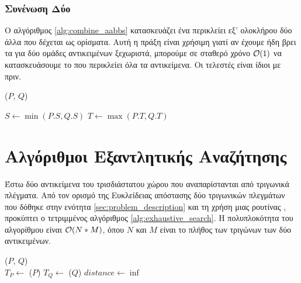 \subsubsection{Συνένωση Δύο }
Ο αλγόριθμος \ref{alg:combine_aabbs} κατασκευάζει ένα  περικλείει
εξ' ολοκλήρου δύο άλλα  που δέχεται ως ορίσματα. 
Αυτή η πράξη είναι χρήσιμη γιατί αν έχουμε ήδη βρει τα  για δύο 
ομάδες αντικειμένων ξεχωριστά, μπορούμε σε σταθερό χρόνο $\mathcal{O}(1)$ να 
κατασκευάσουμε το  που περικλείει όλα τα αντικείμενα. 
Οι τελεστές  είναι ίδιοι με πριν.

\IncMargin{1.5em}
\begin{algorithm}[H]
    \label{alg:combine_aabbs}
    \caption[Κατασκευή  από δύο άλλα ]{
    }
    \DontPrintSemicolon
    \Indm\nonl\combineAABB($P$, $Q$)\\
    \Indp
        
    $S \gets \min(P.S, Q.S)$\;
    $T \gets \max(P.T, Q.T)$\; 
\end{algorithm}
\DecMargin{1.5em}

\section{Αλγόριθμοι Εξαντλητικής Αναζήτησης}
\label{sec:exhaustive_search}
Έστω δύο αντικείμενα του τρισδιάστατου χώρου που αναπαρίστανται από 
τριγωνικά πλέγματα.
Από τον ορισμό της Ευκλείδειας απόστασης δύο τριγωνικών πλεγμάτων που
δόθηκε στην ενότητα \ref{sec:problem_description} και τη χρήση μιας 
ρουτίνας , προκύπτει ο 
τετριμμένος αλγόριθμος \ref{alg:exhaustive_search}. 
Η πολυπλοκότητα του αλγορίθμου είναι $\mathcal{O}(N*M)$, όπου 
$N$ και $M$ είναι το πλήθος των τριγώνων των δύο αντικειμένων.

\IncMargin{1.5em}
\begin{algorithm}[h]
    \caption[Απόσταση Τριγωνικών Πλεγμάτων με Πλήρη Αναζήτηση]{
        }
    \label{alg:exhaustive_search}
    \DontPrintSemicolon
    \Indm\nonl\exhaustivesearch ($P$, $Q$)\\
    \Indp
        $T_P \gets$ \trias($P$) \;
        $T_Q \gets$ \trias($Q$) \; 
        $distance \gets \inf$ \;
\end{algorithm}
\DecMargin{1.5em}

